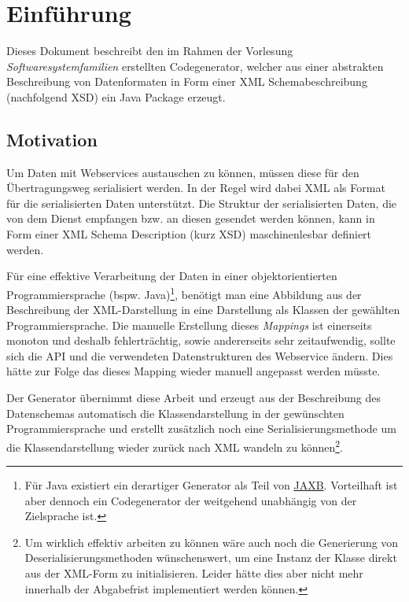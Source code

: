 \section{Einführung}

Dieses Dokument beschreibt den im Rahmen der Vorlesung \emph{Softwaresystemfamilien} erstellten Codegenerator, welcher aus einer abstrakten Beschreibung von Datenformaten in Form einer \gls{XML} Schemabeschreibung (nachfolgend \gls{XSD}) ein Java Package erzeugt.

\subsection{Motivation}
\label{sec:motivation}

Um Daten mit Webservices austauschen zu können, müssen diese für den Übertragungsweg serialisiert werden. In der Regel wird dabei \gls{XML} als Format für die serialisierten Daten unterstützt. Die Struktur der serialisierten Daten, die von dem Dienst empfangen bzw. an diesen gesendet werden können, kann in Form einer XML Schema Description (kurz \gls{XSD}) maschinenlesbar definiert werden.

Für eine effektive Verarbeitung der Daten in einer objektorientierten Programmiersprache (bspw. Java)\footnote{Für Java existiert ein derartiger Generator als Teil von \href{https://jaxb.java.net/}{JAXB}. Vorteilhaft ist aber dennoch ein Codegenerator der weitgehend unabhängig von der Zielsprache ist.}, benötigt man eine Abbildung aus der Beschreibung der XML-Darstellung in eine Darstellung als Klassen der gewählten Programmiersprache. Die manuelle Erstellung dieses \emph{Mappings} ist einerseits monoton und deshalb fehlerträchtig, sowie andererseits sehr zeitaufwendig, sollte sich die API und die verwendeten Datenstrukturen des Webservice ändern. Dies hätte zur Folge das dieses Mapping wieder manuell angepasst werden müsste.

Der Generator übernimmt diese Arbeit und erzeugt aus der Beschreibung des Datenschemas automatisch die Klassendarstellung in der gewünschten Programmiersprache und erstellt zusätzlich noch eine Serialisierungsmethode um die Klassendarstellung wieder zurück nach \gls{XML} wandeln zu können\footnote{Um wirklich effektiv arbeiten zu können wäre auch noch die Generierung von Deserialisierungsmethoden wünschenswert, um eine Instanz der Klasse direkt aus der \gls{XML}-Form zu initialisieren. Leider hätte dies aber nicht mehr innerhalb der Abgabefrist implementiert werden können.}.

